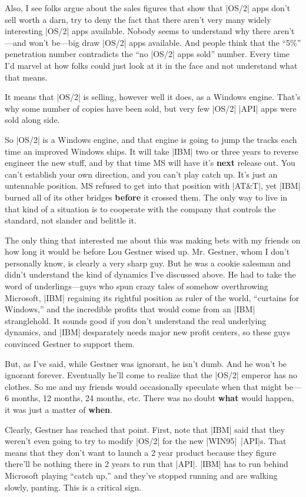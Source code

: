 Also, I see folks argue about the sales figures
that show that |OS/2| apps don't sell worth a darn, try to deny the fact that
there aren't very many widely interesting |OS/2| apps available.  Nobody
seems to understand why there aren't---and won't be---big draw |OS/2| apps
available.  And people think that the ``5\%'' penetration number contradicts
the ``no |OS/2| apps sold'' number.  Every time I'd marvel at how folks
could just look at it in the face and not understand what that means.

It means that |OS/2| is selling, however well it does, as a Windows engine.
That's why some number of copies have been sold, but very few |OS/2|
|API| apps were sold along side.

So |OS/2| is a Windows engine, 
and that engine is going to jump the tracks each time an improved
Windows ships.  It will take |IBM| two or three years to reverse engineer
the new stuff, and by that time MS will have it's {\bf next} release out.
You can't establish your own direction, and you can't play catch up.
It's just an untennable position.  MS refused to get into that position
with |AT\&T|, yet |IBM| burned all of its other bridges {\bf before} it crossed
them.  The only way to live in that kind of a situation is to cooperate
with the company that controls the standard, not slander and belittle it.

The only thing that interested me about this was making bets with my friends 
on how long it would be before Lou Gestner wised up.  Mr. Gestner, whom
I don't personally know, is clearly a very sharp guy.  But he was a
cookie salesman and didn't understand the kind of dynamics I've discussed
above.  He had to take the word of underlings---guys who spun crazy
tales of somehow overthrowing Microsoft, |IBM| regaining its rightful
position as ruler of the world, ``curtains for Windows,'' and the 
incredible profits that would come from an |IBM| stranglehold.  It sounds
good if you don't understand the real underlying dynamics, and |IBM|
desparately needs major new profit centers, so these guys convinced
Gestner to support them.  

But, as I've said, while Gestner was ignorant, he isn't dumb.  And he
won't be ignorant forever.  Eventually he'll come to realize that
the |OS/2| emperor has no clothes.  So me and my friends would occasionally
speculate when that might be---6 months, 12 months, 24 months, etc.
There was no doubt {\bf what} would happen, it was just a matter of
{\bf when}.

Clearly, Gestner has reached that point.  First, note that |IBM| said that
they weren't even going to try to modify |OS/2| for the new |WIN95|~|API|s.
That means that they don't want to launch a 2 year product because
they figure there'll be nothing there in 2 years to run that |API|.
|IBM| has to run behind Microsoft playing ``catch up,'' and they've stopped
running and are walking slowly, panting.  This is a critical sign.

